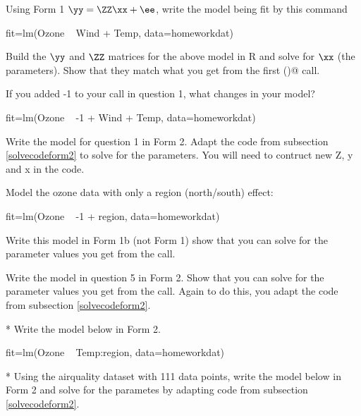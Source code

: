 \begin{hwenumerate} 

\item Using Form 1 $\yy=\ZZ\xx+\ee$, write the model being fit by this command
\begin{Schunk}
\begin{Sinput}
 fit=lm(Ozone ~ Wind + Temp, data=homeworkdat)
\end{Sinput}
\end{Schunk}

\item Build the $\yy$ and $\ZZ$ matrices for the above model in R and solve for $\xx$ (the parameters).  Show that they match what you get from the first \verb@lm()@ call.

\item If you added -1 to your \verb@lm@ call in question 1, what changes in your model?
\begin{Schunk}
\begin{Sinput}
 fit=lm(Ozone ~ -1 + Wind + Temp, data=homeworkdat)
\end{Sinput}
\end{Schunk}

\item Write the model for question 1 in Form 2. Adapt the code from subsection \ref{solvecodeform2} to solve for the parameters. You will need to contruct new Z, y and x in the code.

\item  Model the ozone data with only a region (north/south) effect:

\begin{Schunk}
\begin{Sinput}
 fit=lm(Ozone ~ -1 + region, data=homeworkdat)
\end{Sinput}
\end{Schunk}

Write this model in Form 1b (not Form 1) show that you can solve for the parameter values you get from the \verb@lm@ call.

\item Write the model in question 5 in Form 2. Show that you can solve for the parameter values you get from the \verb@lm@ call.  Again to do this, you adapt the code from subsection \ref{solvecodeform2}.

\item[\theenumi\**] Write the model below in Form 2.

\begin{Schunk}
\begin{Sinput}
 fit=lm(Ozone ~ Temp:region, data=homeworkdat)
\end{Sinput}
\end{Schunk}
\item[\theenumi\**] Using the airquality dataset with 111 data points, write the model below in Form 2 and solve for the parametes by adapting code from subsection \ref{solvecodeform2}.


\end{hwenumerate}
